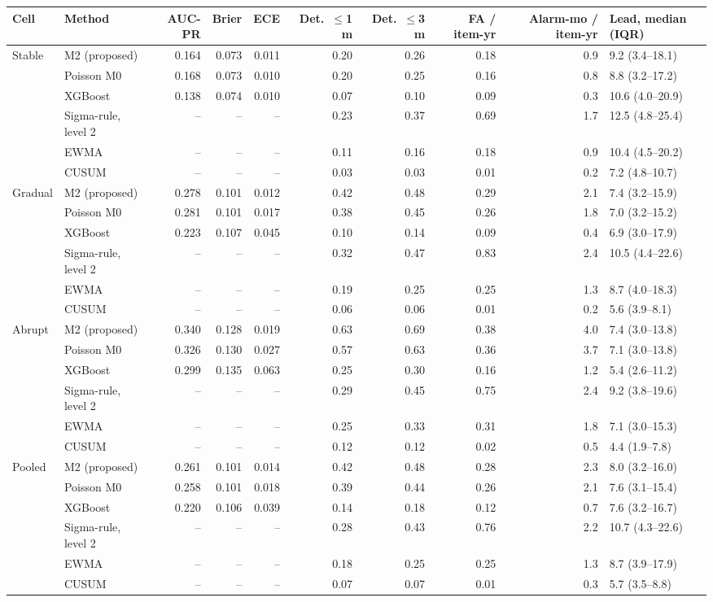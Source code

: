 {\scriptsize
\begin{tabular}{llrrrrrrrl}
\toprule
Cell & Method & AUC-PR & Brier & ECE & Det.\ $\le$1 m & Det.\ $\le$3 m & FA / item-yr & Alarm-mo / item-yr & Lead, median (IQR) \\
\midrule
Stable & M2 (proposed) & 0.164 & 0.073 & 0.011 & 0.20 & 0.26 & 0.18 & 0.9 & 9.2 (3.4--18.1) \\
 & Poisson M0 & 0.168 & 0.073 & 0.010 & 0.20 & 0.25 & 0.16 & 0.8 & 8.8 (3.2--17.2) \\
 & XGBoost & 0.138 & 0.074 & 0.010 & 0.07 & 0.10 & 0.09 & 0.3 & 10.6 (4.0--20.9) \\
 & Sigma-rule, level 2 & -- & -- & -- & 0.23 & 0.37 & 0.69 & 1.7 & 12.5 (4.8--25.4) \\
 & EWMA & -- & -- & -- & 0.11 & 0.16 & 0.18 & 0.9 & 10.4 (4.5--20.2) \\
 & CUSUM & -- & -- & -- & 0.03 & 0.03 & 0.01 & 0.2 & 7.2 (4.8--10.7) \\
\addlinespace
Gradual & M2 (proposed) & 0.278 & 0.101 & 0.012 & 0.42 & 0.48 & 0.29 & 2.1 & 7.4 (3.2--15.9) \\
 & Poisson M0 & 0.281 & 0.101 & 0.017 & 0.38 & 0.45 & 0.26 & 1.8 & 7.0 (3.2--15.2) \\
 & XGBoost & 0.223 & 0.107 & 0.045 & 0.10 & 0.14 & 0.09 & 0.4 & 6.9 (3.0--17.9) \\
 & Sigma-rule, level 2 & -- & -- & -- & 0.32 & 0.47 & 0.83 & 2.4 & 10.5 (4.4--22.6) \\
 & EWMA & -- & -- & -- & 0.19 & 0.25 & 0.25 & 1.3 & 8.7 (4.0--18.3) \\
 & CUSUM & -- & -- & -- & 0.06 & 0.06 & 0.01 & 0.2 & 5.6 (3.9--8.1) \\
\addlinespace
Abrupt & M2 (proposed) & 0.340 & 0.128 & 0.019 & 0.63 & 0.69 & 0.38 & 4.0 & 7.4 (3.0--13.8) \\
 & Poisson M0 & 0.326 & 0.130 & 0.027 & 0.57 & 0.63 & 0.36 & 3.7 & 7.1 (3.0--13.8) \\
 & XGBoost & 0.299 & 0.135 & 0.063 & 0.25 & 0.30 & 0.16 & 1.2 & 5.4 (2.6--11.2) \\
 & Sigma-rule, level 2 & -- & -- & -- & 0.29 & 0.45 & 0.75 & 2.4 & 9.2 (3.8--19.6) \\
 & EWMA & -- & -- & -- & 0.25 & 0.33 & 0.31 & 1.8 & 7.1 (3.0--15.3) \\
 & CUSUM & -- & -- & -- & 0.12 & 0.12 & 0.02 & 0.5 & 4.4 (1.9--7.8) \\
\addlinespace
Pooled & M2 (proposed) & 0.261 & 0.101 & 0.014 & 0.42 & 0.48 & 0.28 & 2.3 & 8.0 (3.2--16.0) \\
 & Poisson M0 & 0.258 & 0.101 & 0.018 & 0.39 & 0.44 & 0.26 & 2.1 & 7.6 (3.1--15.4) \\
 & XGBoost & 0.220 & 0.106 & 0.039 & 0.14 & 0.18 & 0.12 & 0.7 & 7.6 (3.2--16.7) \\
 & Sigma-rule, level 2 & -- & -- & -- & 0.28 & 0.43 & 0.76 & 2.2 & 10.7 (4.3--22.6) \\
 & EWMA & -- & -- & -- & 0.18 & 0.25 & 0.25 & 1.3 & 8.7 (3.9--17.9) \\
 & CUSUM & -- & -- & -- & 0.07 & 0.07 & 0.01 & 0.3 & 5.7 (3.5--8.8) \\
\bottomrule
\end{tabular}

}
